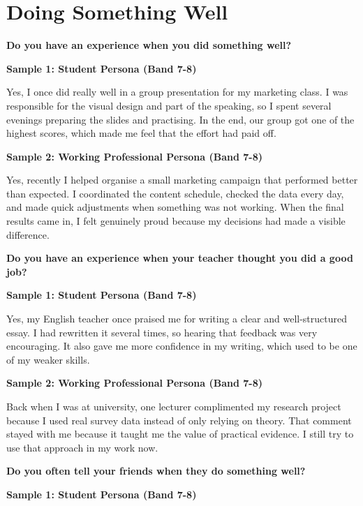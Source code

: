 \newpage

\section{Doing Something Well}
\begin{ieltsquestion}
\textbf{Do you have an experience when you did something well?}
\end{ieltsquestion}
\textbf{Sample 1: Student Persona (Band 7-8)}

Yes, I once did really well in a group presentation for my marketing class. I was responsible for the visual design and part of the speaking, so I spent several evenings preparing the slides and practising. In the end, our group got one of the highest scores, which made me feel that the effort had paid off.

\textbf{Sample 2: Working Professional Persona (Band 7-8)}

Yes, recently I helped organise a small marketing campaign that performed better than expected. I coordinated the content schedule, checked the data every day, and made quick adjustments when something was not working. When the final results came in, I felt genuinely proud because my decisions had made a visible difference.

\separator

\begin{ieltsquestion}
\textbf{Do you have an experience when your teacher thought you did a good job?}
\end{ieltsquestion}
\textbf{Sample 1: Student Persona (Band 7-8)}

Yes, my English teacher once praised me for writing a clear and well-structured essay. I had rewritten it several times, so hearing that feedback was very encouraging. It also gave me more confidence in my writing, which used to be one of my weaker skills.

\textbf{Sample 2: Working Professional Persona (Band 7-8)}

Back when I was at university, one lecturer complimented my research project because I used real survey data instead of only relying on theory. That comment stayed with me because it taught me the value of practical evidence. I still try to use that approach in my work now.

\separator

\begin{ieltsquestion}
\textbf{Do you often tell your friends when they do something well?}
\end{ieltsquestion}
\textbf{Sample 1: Student Persona (Band 7-8)}


